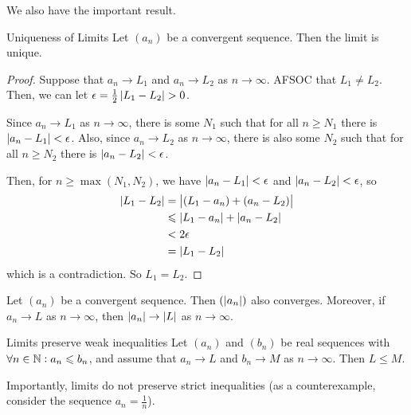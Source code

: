 \documentclass{styles/tufte}
\begin{document}
    We also have the important result.
    
    \begin{theorem}{Uniqueness of Limits}{}
      Let $(a_n)$ be a convergent sequence. Then the limit is unique.
    \end{theorem}
    \begin{proof}
      Suppose that $a_n \to L_1$ and $a_n \to L_2$ as $n \to \infty$. AFSOC that $L_1 \neq L_2$. Then, we can let $\epsilon = \frac{1}{2} \abs{L_1 - L_2} > 0$.
      
      Since $a_n \to L_1$ as $n \to \infty$, there is some $N_1$ such that for all $n \geqslant N_1$ there is $\abs{a_n - L_1} < \epsilon$. Also, since $a_n \to L_2$ as $n \to \infty$, there is also some $N_2$ such that for all $n \geqslant N_2$ there is $\abs{a_n - L_2} < \epsilon$.
      
      Then, for $n \geqslant \max(N_1, N_2)$, we have $\abs{a_n - L_1} < \epsilon$ and $\abs{a_n - L_2} < \epsilon$, so
      \begin{align*}
        \abs{L_1 - L_2} &= \abs{(L_1 - a_n) + (a_n - L_2)} \\
        &\leqslant \abs{L_1 - a_n} + \abs{a_n - L_2} \\
        &< 2\epsilon \\
        &= \abs{L_1 - L_2}
      \end{align*}
      which is a contradiction. So $L_1 = L_2$.
    \end{proof}
    
    \begin{proposition}{}{}
      Let $(a_n)$ be a convergent sequence. Then $(\abs{a_n})$ also converges. Moreover, if $a_n \to L$ as $n \to \infty$, then $\abs{a_n} \to \abs{L}$ as $n \to \infty$.
    \end{proposition}
    
    \begin{proposition}{Limits preserve weak inequalities}{}
      Let $(a_n)$ and $(b_n)$ be real sequences with $\forall n \in \mathbb{N} : a_n \leqslant b_n$, and assume that $a_n \to L$ and $b_n \to M$ as $n \to \infty$. Then $L \leqslant M$.
    \end{proposition}
    
    Importantly, limits do not preserve strict inequalities (as a counterexample, consider the sequence $a_n = \frac{1}{n}$).
    
\end{document}
